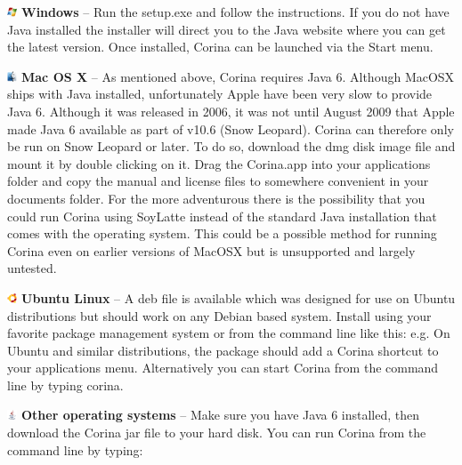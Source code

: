 \begin{description}
\item \includegraphics[width=3mm]{Images/windows.png} \textbf{Windows} -- Run the setup.exe and follow the instructions. If you do not have Java installed the installer will direct you to the Java website where you can get the latest version. Once installed, Corina can be launched via the Start menu.

\item \includegraphics[width=3mm]{Images/mac.png} \textbf{Mac OS X} -- As mentioned above, Corina requires Java 6. Although MacOSX ships with Java installed, unfortunately Apple have been very slow to provide Java 6. Although it was released in 2006, it was not until August 2009 that Apple made Java 6 available as part of v10.6 (Snow Leopard). Corina can therefore only be run on Snow Leopard or later. To do so, download the dmg disk image file and mount it by double clicking on it. Drag the Corina.app into your applications folder and copy the manual and license files to somewhere convenient in your documents folder.  For the more adventurous there is the possibility that you could run Corina using SoyLatte instead of the standard Java installation that comes with the operating system.  This could be a possible method for running Corina even on earlier versions of MacOSX but is unsupported and largely untested.

\item \includegraphics[width=3mm]{Images/ubuntu.png} \textbf{Ubuntu Linux} --  A deb file is available which was designed for use on Ubuntu distributions but should work on any Debian based system. Install using your favorite package management system or from the command line like this: e.g.  On Ubuntu and similar distributions, the package should add a Corina shortcut to your applications menu. Alternatively you can start Corina from the command line by typing corina.

\item \includegraphics[width=3mm]{Images/java.png} \textbf{Other operating systems} -- Make sure you have Java 6 installed, then download the Corina jar file to your hard disk. You can run Corina from the command line by typing: 
\end{description}

